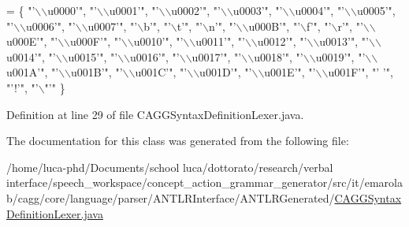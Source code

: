 \begin{DoxyCode}
= \{
        \textcolor{stringliteral}{"'\(\backslash\)\(\backslash\)u0000'"}, \textcolor{stringliteral}{"'\(\backslash\)\(\backslash\)u0001'"}, \textcolor{stringliteral}{"'\(\backslash\)\(\backslash\)u0002'"}, \textcolor{stringliteral}{"'\(\backslash\)\(\backslash\)u0003'"}, \textcolor{stringliteral}{"'\(\backslash\)\(\backslash\)u0004'"}, \textcolor{stringliteral}{"'\(\backslash\)\(\backslash\)u0005'"}, 
        \textcolor{stringliteral}{"'\(\backslash\)\(\backslash\)u0006'"}, \textcolor{stringliteral}{"'\(\backslash\)\(\backslash\)u0007'"}, \textcolor{stringliteral}{"'\(\backslash\)b'"}, \textcolor{stringliteral}{"'\(\backslash\)t'"}, \textcolor{stringliteral}{"'\(\backslash\)n'"}, \textcolor{stringliteral}{"'\(\backslash\)\(\backslash\)u000B'"}, \textcolor{stringliteral}{"'\(\backslash\)f'"}, 
        \textcolor{stringliteral}{"'\(\backslash\)r'"}, \textcolor{stringliteral}{"'\(\backslash\)\(\backslash\)u000E'"}, \textcolor{stringliteral}{"'\(\backslash\)\(\backslash\)u000F'"}, \textcolor{stringliteral}{"'\(\backslash\)\(\backslash\)u0010'"}, \textcolor{stringliteral}{"'\(\backslash\)\(\backslash\)u0011'"}, \textcolor{stringliteral}{"'\(\backslash\)\(\backslash\)u0012'"}, 
        \textcolor{stringliteral}{"'\(\backslash\)\(\backslash\)u0013'"}, \textcolor{stringliteral}{"'\(\backslash\)\(\backslash\)u0014'"}, \textcolor{stringliteral}{"'\(\backslash\)\(\backslash\)u0015'"}, \textcolor{stringliteral}{"'\(\backslash\)\(\backslash\)u0016'"}, \textcolor{stringliteral}{"'\(\backslash\)\(\backslash\)u0017'"}, \textcolor{stringliteral}{"'\(\backslash\)\(\backslash\)u0018'"}, 
        \textcolor{stringliteral}{"'\(\backslash\)\(\backslash\)u0019'"}, \textcolor{stringliteral}{"'\(\backslash\)\(\backslash\)u001A'"}, \textcolor{stringliteral}{"'\(\backslash\)\(\backslash\)u001B'"}, \textcolor{stringliteral}{"'\(\backslash\)\(\backslash\)u001C'"}, \textcolor{stringliteral}{"'\(\backslash\)\(\backslash\)u001D'"}, \textcolor{stringliteral}{"'\(\backslash\)\(\backslash\)u001E'"}, 
        \textcolor{stringliteral}{"'\(\backslash\)\(\backslash\)u001F'"}, \textcolor{stringliteral}{"' '"}, \textcolor{stringliteral}{"'!'"}, \textcolor{stringliteral}{"'\(\backslash\)"'"}
    \}
\end{DoxyCode}


Definition at line 29 of file C\-A\-G\-G\-Syntax\-Definition\-Lexer.\-java.



The documentation for this class was generated from the following file\-:\begin{DoxyCompactItemize}
\item 
/home/luca-\/phd/\-Documents/school luca/dottorato/research/verbal interface/speech\-\_\-workspace/concept\-\_\-action\-\_\-grammar\-\_\-generator/src/it/emarolab/cagg/core/language/parser/\-A\-N\-T\-L\-R\-Interface/\-A\-N\-T\-L\-R\-Generated/\hyperlink{CAGGSyntaxDefinitionLexer_8java}{C\-A\-G\-G\-Syntax\-Definition\-Lexer.\-java}\end{DoxyCompactItemize}

